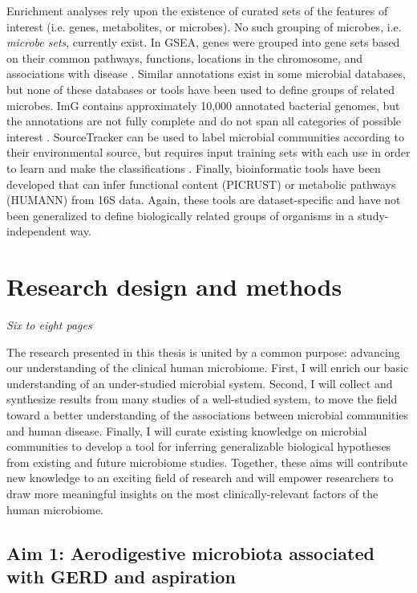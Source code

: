 \documentclass[12pt]{article}
\begin{document}
Enrichment analyses rely upon the existence of curated sets of the features of interest (i.e. genes, metabolites, or microbes).
No such grouping of microbes, i.e. \textit{microbe sets}, currently exist. 
In GSEA, genes were grouped into gene sets based on their common 
pathways, functions, locations in the chromosome, and associations 
with disease \cite{subramanian-gsea-2005}. Similar annotations exist in some microbial databases, 
but none of these databases or tools have been used to define groups 
of related microbes. ImG contains approximately 10,000 annotated 
bacterial genomes, but the annotations are not fully complete and do 
not span all categories of possible interest \cite{markowitz-img-2013}. SourceTracker 
can be used to label microbial communities according to their 
environmental source, but requires input training sets with each use 
in order to learn and make the classifications \cite{knights-sourcetracker-2011}. 
Finally, bioinformatic tools have been developed that can infer functional 
content (PICRUST) \cite{langille-picrust-2013} or metabolic pathways 
(HUMANN) \cite{abubucker-humann-2012} from 16S data. Again, 
these tools are dataset-specific and have not been generalized to 
define biologically related groups of organisms in a study-independent way.

\section{Research design and methods}
\textit{Six to eight pages}

The research presented in this thesis is united by a common purpose: 
advancing our understanding of the clinical human microbiome.
First, I will enrich our basic understanding of an under-studied 
microbial system. Second, I will collect and synthesize 
results from many studies of a well-studied system, to move the 
field toward a better understanding of the associations between 
microbial communities and human disease. Finally, I will curate
existing knowledge on microbial communities to develop a tool for 
inferring generalizable biological hypotheses from existing and future 
microbiome studies. Together, these aims will contribute new knowledge
to an exciting field of research and will empower researchers to draw 
more meaningful insights on the most clinically-relevant factors of
the human microbiome.

\subsection{Aim 1: Aerodigestive microbiota associated with GERD and aspiration}
\end{document}
